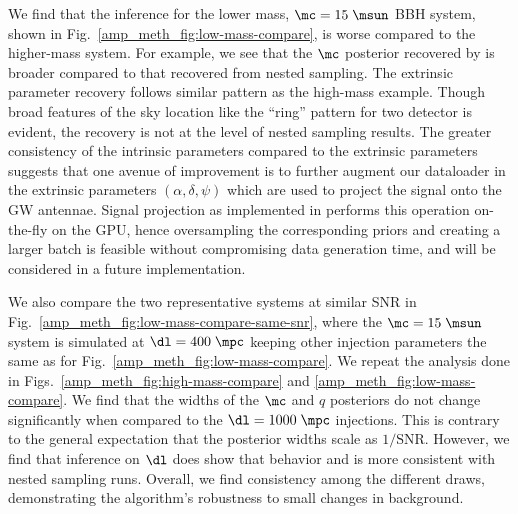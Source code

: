 \begin{refsection}
We find that the inference for the lower mass, $\mc=15\;\msun$ BBH system, shown in Fig.~\ref{amp_meth_fig:low-mass-compare}, is worse compared to the higher-mass system. 
For example, we see that the $\mc$ posterior recovered by {\amplfi} is broader compared to that recovered from nested sampling. 
The extrinsic parameter recovery follows similar pattern as the high-mass example. 
Though broad features of the sky location like the ``ring'' pattern for two detector is evident, the recovery is not at the level of nested sampling results. 
The greater consistency of the intrinsic parameters compared to the extrinsic parameters suggests that one avenue of improvement is to further augment our dataloader in the extrinsic parameters $(\alpha, \delta, \psi)$ which are used to project the signal onto the GW antennae. 
Signal projection as implemented in {\mlgw} performs this operation on-the-fly on the GPU, hence oversampling the corresponding priors and creating a larger batch is feasible without compromising data generation time, and will be considered in a future implementation.

We also compare the two representative systems at similar SNR in Fig.~\ref{amp_meth_fig:low-mass-compare-same-snr}, where the $\mc=15\;\msun$ system is simulated at $\dl=400\;\mpc$ keeping other injection parameters the same as for Fig.~\ref{amp_meth_fig:low-mass-compare}. 
We repeat the analysis done in Figs.~\ref{amp_meth_fig:high-mass-compare} and \ref{amp_meth_fig:low-mass-compare}. 
We find that the widths of the $\mc$ and $q$ posteriors do not change significantly when compared to the $\dl=1000\;\mpc$ injections. 
This is contrary to the general expectation that the posterior widths scale as $1/\mathrm{SNR}$. 
However, we find that inference on $\dl$ does show that behavior and is more consistent with nested sampling runs. 
Overall, we find consistency among the different {\amplfi} draws, demonstrating the algorithm's robustness to small changes in background.


\end{refsection}

